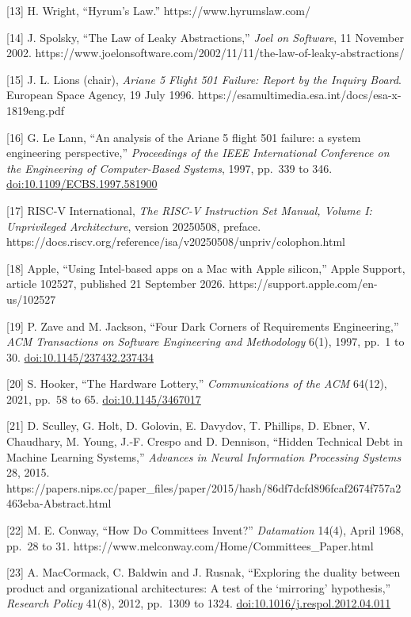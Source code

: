\documentclass[
  10pt,
]{article}
\begin{document}
{[}13{]} H. Wright, ``Hyrum's Law.'' https://www.hyrumslaw.com/

{[}14{]} J. Spolsky, ``The Law of Leaky Abstractions,'' \emph{Joel on
Software}, 11 November 2002.
https://www.joelonsoftware.com/2002/11/11/the-law-of-leaky-abstractions/

{[}15{]} J. L. Lions (chair), \emph{Ariane 5 Flight 501 Failure: Report
by the Inquiry Board}. European Space Agency, 19 July 1996.
https://esamultimedia.esa.int/docs/esa-x-1819eng.pdf

{[}16{]} G. Le Lann, ``An analysis of the Ariane 5 flight 501 failure: a
system engineering perspective,'' \emph{Proceedings of the IEEE
International Conference on the Engineering of Computer-Based Systems},
1997, pp.~339 to 346.
\href{https://doi.org/10.1109/ECBS.1997.581900}{doi:10.1109/ECBS.1997.581900}

{[}17{]} RISC-V International, \emph{The RISC-V Instruction Set Manual,
Volume I: Unprivileged Architecture}, version 20250508, preface.
https://docs.riscv.org/reference/isa/v20250508/unpriv/colophon.html

{[}18{]} Apple, ``Using Intel-based apps on a Mac with Apple silicon,''
Apple Support, article 102527, published 21 September 2026.
https://support.apple.com/en-us/102527

{[}19{]} P. Zave and M. Jackson, ``Four Dark Corners of Requirements
Engineering,'' \emph{ACM Transactions on Software Engineering and
Methodology} 6(1), 1997, pp.~1 to 30.
\href{https://doi.org/10.1145/237432.237434}{doi:10.1145/237432.237434}

{[}20{]} S. Hooker, ``The Hardware Lottery,'' \emph{Communications of
the ACM} 64(12), 2021, pp.~58 to 65.
\href{https://doi.org/10.1145/3467017}{doi:10.1145/3467017}

{[}21{]} D. Sculley, G. Holt, D. Golovin, E. Davydov, T. Phillips, D.
Ebner, V. Chaudhary, M. Young, J.-F. Crespo and D. Dennison, ``Hidden
Technical Debt in Machine Learning Systems,'' \emph{Advances in Neural
Information Processing Systems} 28, 2015.
https://papers.nips.cc/paper\_files/paper/2015/hash/86df7dcfd896fcaf2674f757a2463eba-Abstract.html

{[}22{]} M. E. Conway, ``How Do Committees Invent?'' \emph{Datamation}
14(4), April 1968, pp.~28 to 31.
https://www.melconway.com/Home/Committees\_Paper.html

{[}23{]} A. MacCormack, C. Baldwin and J. Rusnak, ``Exploring the
duality between product and organizational architectures: A test of the
`mirroring' hypothesis,'' \emph{Research Policy} 41(8), 2012, pp.~1309
to 1324.
\href{https://doi.org/10.1016/j.respol.2012.04.011}{doi:10.1016/j.respol.2012.04.011}
\end{document}
